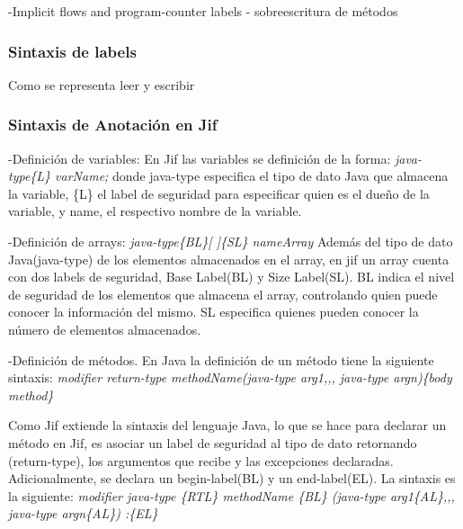 -Implicit flows and program-counter labels\newline
- sobreescritura de métodos

\subsubsection{Sintaxis de labels}
Como se representa leer y escribir

\subsubsection{Sintaxis de Anotación en Jif}
\label{sssec:JifSintax} 

-Definición de variables: \newline 
En Jif las variables se definición de la forma: 
\emph{ java-type\{L\} varName; }\newline 
donde java-type especifica el tipo de dato Java que
almacena la variable, \{L\} el label de seguridad  para especificar quien es el
dueño de la variable, y name, el respectivo nombre de la variable.

-Definición de arrays:\newline
\emph{java-type\{BL\}[ ]\{SL\} nameArray}\newline
Además del tipo de dato Java(java-type) de los elementos almacenados en el
array,  en jif un array cuenta con dos labels de seguridad, Base Label(BL) y
Size Label(SL). BL indica el nivel de seguridad de los elementos que almacena el
array, controlando quien puede conocer la información del mismo. SL especifica
quienes pueden conocer la número de elementos almacenados.

-Definición de métodos.\newline
En Java la definición de un método tiene la siguiente sintaxis:\newline
\emph{modifier return-type methodName(java-type arg1,,, java-type
argn)\{body method\}}

Como Jif extiende la sintaxis del lenguaje Java, lo que se hace para
declarar un método en Jif, es asociar un label de seguridad al tipo de dato
retornando (return-type), los argumentos que recibe y las excepciones
declaradas. Adicionalmente, se declara un begin-label(BL) y un end-label(EL). La
sintaxis es la siguiente:\newline
\emph{ modifier java-type \{RTL\} methodName \{BL\} (java-type arg1\{AL\},,,
java-type argn\{AL\}) :\{EL\} }

